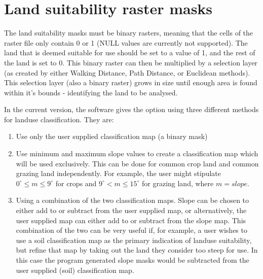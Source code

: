 \section{Land suitability raster masks} 

The land suitability masks must be binary rasters, meaning that the cells of
the raster file only contain 0 or 1 (NULL values are currently not supported).
The land that is deemed suitable for use should be set to a value of 1, and the
rest of the land is set to 0.  This binary raster  can then be multiplied by a
selection layer (as created by either Walking Distance, Path Distance,
or Euclidean methods).  This selection layer (also a binary raster) grows in
size until enough area is
found within it's bounds - identifying the land to be analysed.

In the current version, the software gives the option using three different
methods for landuse classification.  They are: 

\begin{enumerate} 

\item  Use only the user supplied classification map (a binary mask) 

\item  Use minimum and maximum slope values to create a classification map
which will be used exclusively.  This can be done for common crop land and
common grazing land independently.  For example, the user might stipulate
$0^\circ \leq m \leq 9^\circ$ for crops and $9^\circ < m \leq 15^\circ$ for
grazing land, where $m=slope$.  

\item  Using a combination of the two classification maps.  Slope can be chosen
to either add to or subtract from the user supplied map, or alternatively, the
user supplied map can either add to or subtract from the slope map.  This
combination of the two can be very useful if, for example, a user wishes to use
a soil classification map as the primary indication of landuse suitability, but
refine that map by taking out the land they consider too steep for use.  In
this case the program generated slope masks would be subtracted from the user
supplied (soil) classification map.  

\end{enumerate}

